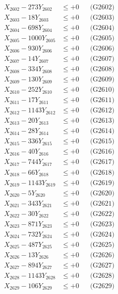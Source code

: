 \documentclass[a4paper,10pt]{article}
\begin{document}
{\begin{align}
X_{2602} - 273Y_{2602} &\leq +0 && \text{(G2602)} \\
X_{2603} - 18Y_{2603} &\leq +0 && \text{(G2603)} \\
X_{2604} - 698Y_{2604} &\leq +0 && \text{(G2604)} \\
X_{2605} - 1000Y_{2605} &\leq +0 && \text{(G2605)} \\
X_{2606} - 930Y_{2606} &\leq +0 && \text{(G2606)} \\
X_{2607} - 14Y_{2607} &\leq +0 && \text{(G2607)} \\
X_{2608} - 334Y_{2608} &\leq +0 && \text{(G2608)} \\
X_{2609} - 130Y_{2609} &\leq +0 && \text{(G2609)} \\
X_{2610} - 252Y_{2610} &\leq +0 && \text{(G2610)} \\
\allowbreak
X_{2611} - 17Y_{2611} &\leq +0 && \text{(G2611)} \\
X_{2612} - 1143Y_{2612} &\leq +0 && \text{(G2612)} \\
X_{2613} - 20Y_{2613} &\leq +0 && \text{(G2613)} \\
X_{2614} - 28Y_{2614} &\leq +0 && \text{(G2614)} \\
X_{2615} - 336Y_{2615} &\leq +0 && \text{(G2615)} \\
X_{2616} - 40Y_{2616} &\leq +0 && \text{(G2616)} \\
X_{2617} - 744Y_{2617} &\leq +0 && \text{(G2617)} \\
X_{2618} - 66Y_{2618} &\leq +0 && \text{(G2618)} \\
X_{2619} - 1143Y_{2619} &\leq +0 && \text{(G2619)} \\
X_{2620} - 5Y_{2620} &\leq +0 && \text{(G2620)} \\
\allowbreak
X_{2621} - 343Y_{2621} &\leq +0 && \text{(G2621)} \\
X_{2622} - 30Y_{2622} &\leq +0 && \text{(G2622)} \\
X_{2623} - 871Y_{2623} &\leq +0 && \text{(G2623)} \\
X_{2624} - 732Y_{2624} &\leq +0 && \text{(G2624)} \\
X_{2625} - 487Y_{2625} &\leq +0 && \text{(G2625)} \\
X_{2626} - 13Y_{2626} &\leq +0 && \text{(G2626)} \\
X_{2627} - 894Y_{2627} &\leq +0 && \text{(G2627)} \\
X_{2628} - 1143Y_{2628} &\leq +0 && \text{(G2628)} \\
X_{2629} - 106Y_{2629} &\leq +0 && \text{(G2629)} \\

\end{align}}
\end{document}
